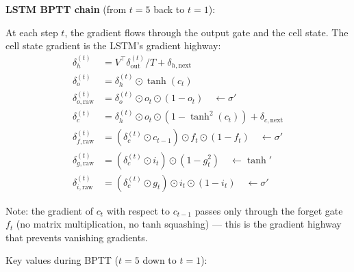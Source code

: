 \textbf{LSTM BPTT chain} (from $t=5$ back to $t=1$):

At each step $t$, the gradient flows through the output gate and the cell state. The
cell state gradient is the LSTM's gradient highway:
\begin{align}
    \delta_h^{(t)} &= V^\top \delta_{\text{out}}^{(t)}/T + \delta_{h,\text{next}} \\
    \delta_{o}^{(t)} &= \delta_h^{(t)} \odot \tanh(c_t) \\
    \delta_{o,\text{raw}}^{(t)} &= \delta_o^{(t)} \odot o_t \odot (1 - o_t) \quad \leftarrow \sigma' \\
    \delta_c^{(t)} &= \delta_h^{(t)} \odot o_t \odot (1 - \tanh^2(c_t)) + \delta_{c,\text{next}} \\
    \delta_{f,\text{raw}}^{(t)} &= (\delta_c^{(t)} \odot c_{t-1}) \odot f_t \odot (1 - f_t) \quad \leftarrow \sigma' \\
    \delta_{g,\text{raw}}^{(t)} &= (\delta_c^{(t)} \odot i_t) \odot (1 - g_t^2) \quad \leftarrow \tanh' \\
    \delta_{i,\text{raw}}^{(t)} &= (\delta_c^{(t)} \odot g_t) \odot i_t \odot (1 - i_t) \quad \leftarrow \sigma'
\end{align}

Note: the gradient of $c_t$ with respect to $c_{t-1}$ passes only through the forget
gate $f_t$ (no matrix multiplication, no tanh squashing) --- this is the gradient highway
that prevents vanishing gradients.

Key values during BPTT ($t = 5$ down to $t = 1$):

\begin{center}
\end{center}

